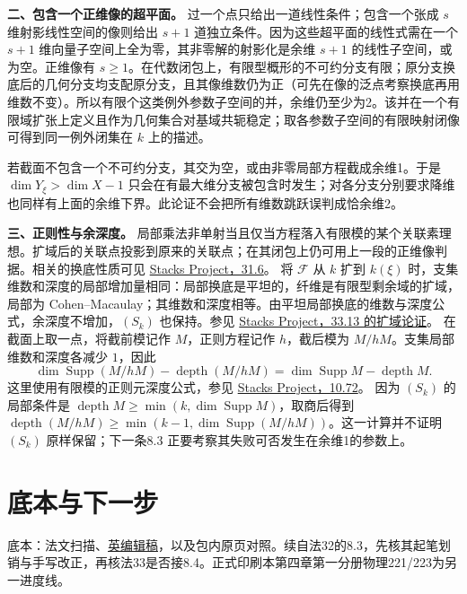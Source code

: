 \documentclass[openany,fontset=fandol]{ctexbook}
\DeclareMathOperator{\depth}{depth}
\DeclareMathOperator{\Supp}{Supp}
\begin{document}
\textbf{二、包含一个正维像的超平面。}
过一个点只给出一道线性条件；包含一个张成 $s$ 维射影线性空间的像则给出 $s+1$ 道独立条件。因为这些超平面的线性式需在一个 $s+1$ 维向量子空间上全为零，其非零解的射影化是余维 $s+1$ 的线性子空间，或为空。正维像有 $s\ge1$。在代数闭包上，有限型概形的不可约分支有限；原分支换底后的几何分支均支配原分支，且其像维数仍为正（可先在像的泛点考察换底再用维数不变）。所以有限个这类例外参数子空间的并，余维仍至少为2。该并在一个有限域扩张上定义且作为几何集合对基域共轭稳定；取各参数子空间的有限映射闭像可得到同一例外闭集在 $k$ 上的描述。

若截面不包含一个不可约分支，其交为空，或由非零局部方程截成余维1。于是 $\dim Y_\xi>\dim X-1$ 只会在有最大维分支被包含时发生；对各分支分别要求降维也同样有上面的余维下界。此论证不会把所有维数跳跃误判成恰余维2。

\newpage
\textbf{三、正则性与余深度。}
局部乘法非单射当且仅当方程落入有限模的某个关联素理想。扩域后的关联点投影到原来的关联点；在其闭包上仍可用上一段的正维像判据。相关的换底性质可见
\href{https://stacks.math.columbia.edu/tag/05EW}{Stacks Project，31.6}。
将 $\mathcal F$ 从 $k$ 扩到 $k(\xi)$ 时，支集维数和深度的局部增加量相同：局部换底是平坦的，纤维是有限型剩余域的扩域，局部为 Cohen--Macaulay；其维数和深度相等。由平坦局部换底的维数与深度公式，余深度不增加，$(S_k)$ 也保持。参见
\href{https://stacks.math.columbia.edu/tag/045O}{Stacks Project，33.13 的扩域论证}。
在截面上取一点，将截前模记作 $M$，正则方程记作 $h$，截后模为 $M/hM$。支集局部维数和深度各减少 $1$，因此
\[
 \dim\Supp(M/hM)-\depth(M/hM)=\dim\Supp M-\depth M.
\]
这里使用有限模的正则元深度公式，参见
\href{https://stacks.math.columbia.edu/tag/00LE}{Stacks Project，10.72}。
因为 $(S_k)$ 的局部条件是 $\depth M\ge\min(k,\dim\Supp M)$，取商后得到 $\depth(M/hM)\ge\min(k-1,\dim\Supp(M/hM))$。这一计算并不证明 $(S_k)$ 原样保留；下一条8.3 正要考察其失败可否发生在余维1的参数上。

\section*{底本与下一步}
底本：法文扫描、\href{https://webusers.imj-prg.fr/~leila.schneps/grothendieckcircle/EGA/EGA5trans.pdf}{英编辑稿}，以及包内原页对照。续自法32的8.3，先核其起笔划销与手写改正，再核法33是否接8.4。正式印刷本第四章第一分册物理221/223为另一进度线。
\end{document}
